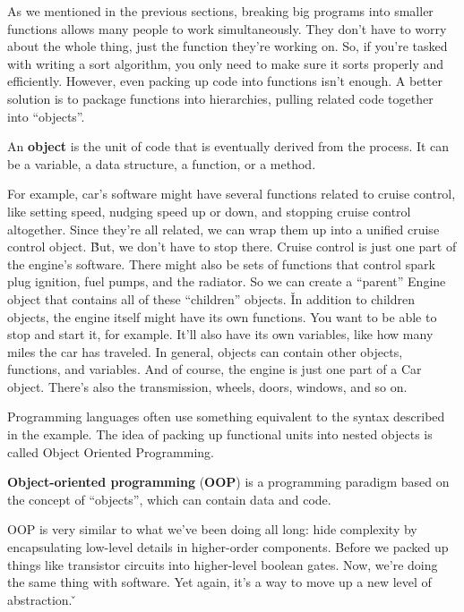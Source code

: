As we mentioned in the previous sections, breaking big programs into smaller functions allows many people to work
simultaneously. They don't have to worry about the whole thing, just the function they're working on. So,  if you're
tasked with writing a sort algorithm, you only need to make sure it sorts properly and efficiently. However, even
packing up code into functions isn't enough. A better solution is to package functions into hierarchies, pulling
related code together into ``objects''.

\bd[Object]
An \textbf{object} is the unit of code that is eventually derived from the process. It can be a variable, a data
structure, a function, or a method.
\ed

\be
For example, car's software might have several functions related to cruise control, like setting speed, nudging speed
up or down, and stopping cruise control altogether. Since they're all related, we can wrap them up into a unified
cruise control object. \v

But, we don't have to stop there. Cruise control is just one part of the engine's software. There might also be sets
of functions that control spark plug ignition, fuel pumps, and the radiator. So we can create a ``parent'' Engine
object that contains all of these ``children'' objects. \v

In addition to children objects, the engine itself might have its own functions. You want to be able to stop and
start it, for example. It'll also have its own variables, like how many miles the car has traveled. In general,
objects can contain other objects, functions, and variables. And of course, the engine is just one part of a Car
object. There's also the transmission, wheels, doors, windows, and so on.
\ee

Programming languages often use something equivalent to the syntax described in the example. The idea of packing up
functional units into nested objects is called Object Oriented Programming.

\textbf{Object-oriented programming} (\textbf{OOP}) is a programming paradigm based on the concept of ``objects'',
which can contain data and code.
\ed

OOP is very similar to what we've been doing all long: hide complexity by encapsulating low-level details in
higher-order components. Before we packed up things like transistor circuits into higher-level boolean gates. Now,
we're doing the same thing with software. Yet again, it's a way to move up a new level of abstraction. \v

